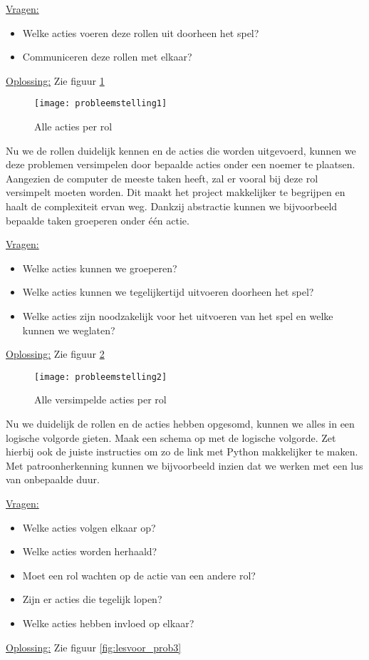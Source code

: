 \underline{Vragen:}
\begin{itemize}
    \item Welke acties voeren deze rollen uit doorheen het spel?
    \item Communiceren deze rollen met elkaar?
\end{itemize}
\underline{Oplossing:}
Zie figuur \ref{fig:lesvoor_prob1}

\begin{figure}
    \texttt{[image: probleemstelling1]}
    \caption{Alle acties per rol}
    \label{fig:lesvoor_prob1}
\end{figure}

Nu we de rollen duidelijk kennen en de acties die worden uitgevoerd, kunnen we deze problemen versimpelen door bepaalde acties onder een noemer te plaatsen. Aangezien de computer de meeste taken heeft, zal er vooral bij deze rol versimpelt moeten worden. Dit maakt het project makkelijker te begrijpen en haalt de complexiteit ervan weg. Dankzij abstractie kunnen we bijvoorbeeld bepaalde taken groeperen onder één actie.

\underline{Vragen:}
\begin{itemize}
    \item Welke acties kunnen we groeperen?
    \item Welke acties kunnen we tegelijkertijd uitvoeren doorheen het spel?
    \item Welke acties zijn noodzakelijk voor het uitvoeren van het spel en welke kunnen we weglaten?
\end{itemize}
\underline{Oplossing:}
Zie figuur \ref{fig:lesvoor_prob2}

\begin{figure}
    \texttt{[image: probleemstelling2]}
    \caption{Alle versimpelde acties per rol}
    \label{fig:lesvoor_prob2}
\end{figure}

Nu we duidelijk de rollen en de acties hebben opgesomd, kunnen we alles in een logische volgorde gieten. Maak een schema op met de logische volgorde. Zet hierbij ook de juiste instructies om zo de link met Python makkelijker te maken. Met patroonherkenning kunnen we bijvoorbeeld inzien dat we werken met een lus van onbepaalde duur.

\underline{Vragen:}
\begin{itemize}
    \item Welke acties volgen elkaar op?
    \item Welke acties worden herhaald?
    \item Moet een rol wachten op de actie van een andere rol?
    \item Zijn er acties die tegelijk lopen?
    \item Welke acties hebben invloed op elkaar?
\end{itemize}
\underline{Oplossing:}
Zie figuur \ref{fig:lesvoor_prob3}

